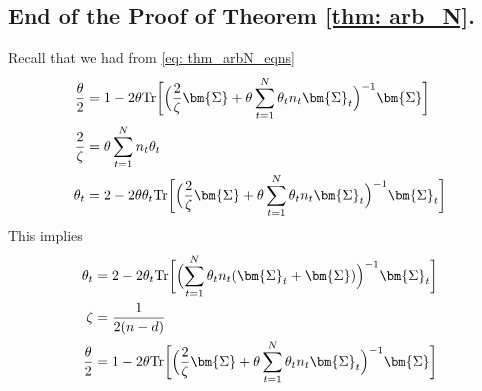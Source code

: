 \documentclass[final]{l4dc2026}
\newcommand{\bSigma}{\bm{\Sigma}}
\newcommand{\be}{\mathbf{e}}
\newcommand{\bh}{\mathbf{h}}
\newcommand{\tr}{\text{Tr}}
\begin{document}
\subsection{End of the Proof of Theorem \ref{thm: arb_N}. }
Recall that we had from \eqref{eq: thm_arbN_eqns}
\begin{align*}
     \frac{\theta}{2}  &= 1 -  2 \theta \tr\biggl[ \Bigl(\frac{2}{\zeta}\bSigma+\theta\sum_{t=1}^N \theta_t n_t \bSigma_t \Bigr)^{-1} \bSigma \biggr] \\
    \frac{2}{\zeta} &= \theta  \sum_{t=1}^N n_t \theta_t \\
    \theta_t &= 2 - 2 \theta \theta_t \tr \biggl[ \Bigl(\frac{2}{\zeta}\bSigma+\theta\sum_{t=1}^N \theta_t n_t \bSigma_t \Bigr)^{-1} \bSigma_t \biggr]
\end{align*}
This implies
\begin{align*}
     \theta_t &= 2 - 2 \theta_t \tr \biggl[\Bigl(\sum_{t=1}^N \theta_t n_t (\bSigma_t + \bSigma) \Bigr)^{-1} \bSigma_t\biggr] \\
    \zeta &= \frac{1}{2(n-d)} \\
    \frac{\theta}{2}  &= 1 -  2 \theta \tr\biggl[ \Bigl(\frac{2}{\zeta}\bSigma+\theta\sum_{t=1}^N \theta_t n_t \bSigma_t \Bigr)^{-1} \bSigma \biggr]
\end{align*}
\end{document}
